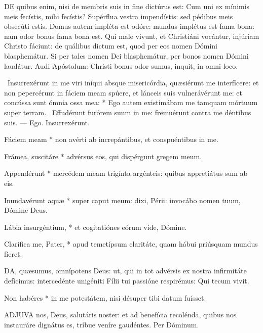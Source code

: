 
\lettrine[lines=2]{D}{E} quibus enim, nisi de membris suis in fine dictúrus est: Cum uni ex mínimis meis fecístis, mihi fecístis? Supérflua vestra impendístis: sed pédibus meis obsecúti estis. Domus autem impléta est odóre: mundus implétus est fama bona: nam odor bonus fama bona est. Qui male vivunt, et Christiáni vocántur, injúriam Christo fáciunt: de quálibus dictum est, quod per eos nomen Dómini blasphemátur. Si per tales nomen Dei blasphemátur, per bonos nomen Dómini laudátur. Audi Apóstolum: Christi bonus odor sumus, inquit, in omni loco.

\R\ Insurrexérunt in me viri iníqui absque misericórdia, quæsiérunt me interfícere: et non pepercérunt in fáciem meam spúere, et lánceis suis vulnerávérunt me: et concússa sunt ómnia ossa mea: * Ego autem existimábam me tamquam mórtuum super terram. \V\ Effudérunt furórem suum in me: fremuérunt contra me déntibus suis. --- Ego. Insurrexérunt.



 Fáciem meam * non avérti ab increpántibus, et conspuéntibus in me.


 Frámea, suscitáre * advérsus eos, qui dispérgunt gregem meum.

 Appendérunt * mercédem meam trigínta argénteis: quibus appretiátus sum ab eis.

 Inundavérunt aquæ * super caput meum: dixi, Périi: invocábo nomen tuum, Dómine Deus.

 Lábia insurgéntium, * et cogitatiónes eórum vide, Dómine.

 Clarífica me, Pater, * apud temetípsum claritáte, quam hábui priúsquam mundus fíeret.


\lettrine[lines=2]{D}{A}, quæsumus, omnípotens Deus: ut, qui in tot advérsis ex nostra infirmitáte defícimus: intercedénte unigéniti Fílii tui passióne respirémus: Qui tecum vivit.


 Non habéres * in me potestátem, nisi désuper tibi datum fuísset.


\lettrine[lines=2]{A}{DJUVA} nos, Deus, salutáris noster: et ad benefícia recolénda, quibus nos instauráre dignátus es, tríbue veníre gaudéntes. Per Dóminum.

